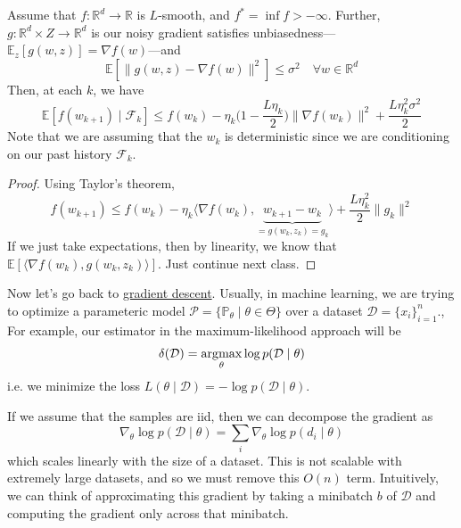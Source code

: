 	\begin{theorem}
	  \label{thm:expected-descent}
		Assume that $f: \mathbb{R}^d \to \mathbb{R}$ is $L$-smooth, and $f^\ast = \inf{f} > -\infty$. Further, $g: \mathbb{R}^d \times Z \to \mathbb{R}^d$ is our noisy gradient satisfies unbiasedness---$\mathbb{E}_z [g(w, z)] = \nabla f(w)$---and 
		\begin{equation}
			\mathbb{E}[ \|g(w, z) - \nabla f(w)\|^2 ] \leq \sigma^2 \quad \forall w \in \mathbb{R}^d
		\end{equation}
		Then, at each $k$, we have 
		\begin{equation}
			\mathbb{E}[f(w_{k+1}) \mid \mathcal{F}_k] \leq f(w_k) - \eta_k \big( 1  -\frac{L \eta_k}{2} \big) \|\nabla f(w_k)\|^2 + \frac{L \eta_k^2 \sigma^2}{2}
		\end{equation}
		Note that we are assuming that the $w_k$ is deterministic since we are conditioning on our past history $\mathcal{F}_k$. 
	\end{theorem}
	\begin{proof}
	  Using Taylor's theorem, 
		\begin{equation}
			f(w_{k+1}) \leq f(w_k) - \eta_k \langle \nabla f(w_k), \underbrace{w_{k+1} - w_k}_{ = g(w_k, z_k) = g_k} \rangle + \frac{L \eta_k^2}{2} \| g_k\|^2
		\end{equation}
		If we just take expectations, then by linearity, we know that $\mathbb{E}[\langle \nabla f(w_k), g (w_k, z_k) \rangle]$. Just continue next class. 
	\end{proof}





  Now let's go back to \hyperref[def:gradient_descent]{gradient descent}. Usually, in machine learning, we are trying to optimize a parameteric model $\mathcal{P} = \{ \mathbb{P}_\theta \mid \theta \in \Theta\}$ over a dataset $\mathcal{D} = \{x_i\}_{i=1}^n$., For example, our estimator in the maximum-likelihood approach will be 
  \begin{equation}
    \delta(\mathcal{D}) = \operatorname*{\arg\!\max}_{\theta} \log p(\mathcal{D} \mid \theta)
  \end{equation}
  i.e. we minimize the loss $L(\theta \mid \mathcal{D}) = -\log p(\mathcal{D} \mid \theta)$. 

  If we assume that the samples are iid, then we can decompose the gradient as 
  \begin{equation}
    \nabla_\theta \log{p(\mathcal{D} \mid \theta)} = \sum_i \nabla_\theta \log{p(d_i \mid \theta)}
  \end{equation}
  which scales linearly with the size of a dataset. This is not scalable with extremely large datasets, and so we must remove this $O(n)$ term. Intuitively, we can think of approximating this gradient by taking a minibatch $b$ of $\mathcal{D}$ and computing the gradient only across that minibatch. 

